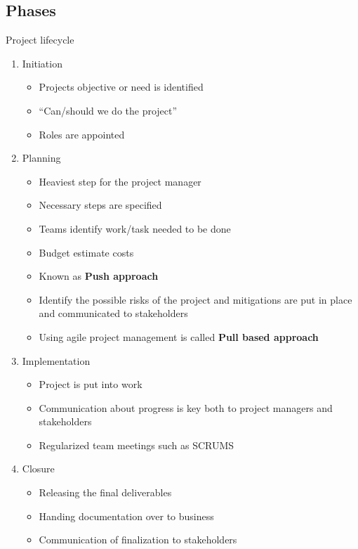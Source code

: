 \documentclass[12pt]{report}
\title{\Huge{}\\}
\author{\huge{}}
\date{}
\begin{document}
\chapter{}
\section{Phases}
Project lifecycle
\begin{enumerate}
  \item Initiation
        \begin{itemize}
                \item Projects objective or need is identified
                \item ``Can/should we do the project''
                \item Roles are appointed
        \end{itemize}
  \item Planning
        \begin{itemize}
          \item Heaviest step for the project manager
          \item Necessary steps are specified
          \item Teams identify work/task needed to be done
        \item Budget estimate costs
                \item Known as \textbf{Push approach}
                \item Identify the possible risks of the project and mitigations are put in place and communicated to stakeholders
                \item Using agile project management is called \textbf{Pull based approach}
        \end{itemize}
  \item Implementation
        \begin{itemize}
          \item Project is put into work
          \item Communication about progress is key both to project managers and stakeholders
                \item Regularized team meetings such as SCRUMS
        \end{itemize}
  \item Closure
        \begin{itemize}
          \item Releasing the final deliverables
          \item Handing documentation over to business
                \item Communication of finalization to stakeholders
        \end{itemize}
\end{enumerate}
\end{document}
